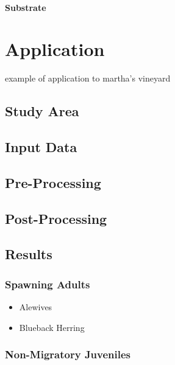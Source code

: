 \documentclass[
]{book}
\providecommand{\tightlist}{%
  \setlength{\itemsep}{0pt}\setlength{\parskip}{0pt}}
\begin{document}
\hypertarget{substrate-11}{%
\subsubsection{Substrate}\label{substrate-11}}

\hypertarget{application}{%
\chapter{Application}\label{application}}

example of application to martha's vineyard

\hypertarget{study-area}{%
\section{Study Area}\label{study-area}}

\hypertarget{input-data}{%
\section{Input Data}\label{input-data}}

\hypertarget{pre-processing}{%
\section{Pre-Processing}\label{pre-processing}}

\hypertarget{post-processing}{%
\section{Post-Processing}\label{post-processing}}

\hypertarget{results}{%
\section{Results}\label{results}}

\hypertarget{spawning-adults-2}{%
\subsection{Spawning Adults}\label{spawning-adults-2}}

\begin{itemize}
\tightlist
\item
  Alewives
\item
  Blueback Herring
\end{itemize}

\hypertarget{non-migratory-juveniles-4}{%
\subsection{Non-Migratory Juveniles}\label{non-migratory-juveniles-4}}
\end{document}
